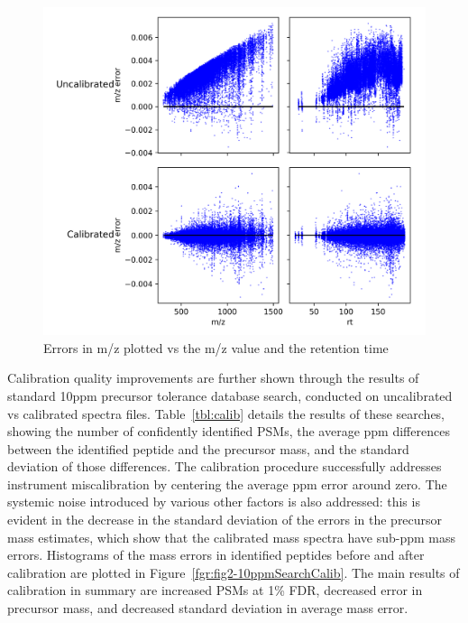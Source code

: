 \documentclass[journal=jprobs,manuscript=article]{achemso}
\begin{document}
\begin{figure}[H]
 \includegraphics{fig1-calibErrors.png}
 \caption{Errors in m/z plotted vs the m/z value and the retention time}
 \label{fgr:fig1-calibErrors}
\end{figure}

Calibration quality improvements are further shown through the results of standard 10ppm precursor tolerance database search, conducted on uncalibrated vs calibrated spectra files.
Table~\ref{tbl:calib} details the results of these searches, showing the number of confidently identified PSMs, the average ppm differences between the identified peptide and the precursor mass, and the standard deviation of those differences.
The calibration procedure successfully addresses instrument miscalibration by centering the average ppm error around zero.
The systemic noise introduced by various other factors is also addressed: this is evident in the decrease in the standard deviation of the errors in the precursor mass estimates, which show that the calibrated mass spectra have sub-ppm mass errors.
Histograms of the mass errors in identified peptides before and after calibration are plotted in Figure~\ref{fgr:fig2-10ppmSearchCalib}.
The main results of calibration in summary are increased PSMs at 1\% FDR, decreased error in precursor mass, and decreased standard deviation in average mass error. 
\end{document}
